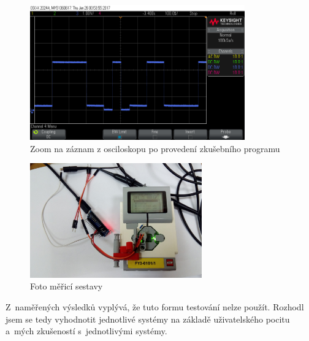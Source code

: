 \begin{figure}[h]
	\centering
	\includegraphics[width=350px]{images/measuring-oscilloscope_ev3-software_led-blinking_part1.png}
	\caption[Zoom na záznam z osciloskopu po provedení zkušebního programu]{Zoom na záznam z osciloskopu po provedení zkušebního programu}
	\label{fig:measuring_lego-ev3_orig-soft_led-blinking_part1}
\end{figure}

\begin{figure}[h]
	\centering
	\includegraphics[width=280px]{images/measuring-system_photo.jpg}
	\caption[Foto měřicí sestavy]{Foto měřicí sestavy}
	\label{fig:measuring-system_photo}
\end{figure}

Z~naměřených výsledků vyplývá, že tuto formu testování nelze použít.
Rozhodl jsem se tedy vyhodnotit jednotlivé systémy na základě uživatelského pocitu a~mých zkušeností s~jednotlivými systémy.



